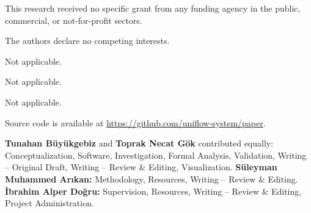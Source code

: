 \documentclass[pdflatex,sn-basic]{sn-jnl}
\begin{document}

This research received no specific grant from any funding agency in the public, commercial, or not-for-profit sectors.

The authors declare no competing interests.

Not applicable.

Not applicable.

Not applicable.

Source code is available at \url{https://github.com/uniflow-system/paper}.

\textbf{Tunahan Büyükgebiz} and \textbf{Toprak Necat Gök} contributed equally: Conceptualization, Software, Investigation, Formal Analysis, Validation, Writing – Original Draft, Writing – Review \& Editing, Visualization.
\textbf{Süleyman Muhammed Arıkan:} Methodology, Resources, Writing – Review \& Editing.
\textbf{İbrahim Alper Doğru:} Supervision, Resources, Writing – Review \& Editing, Project Administration.


\end{document}
